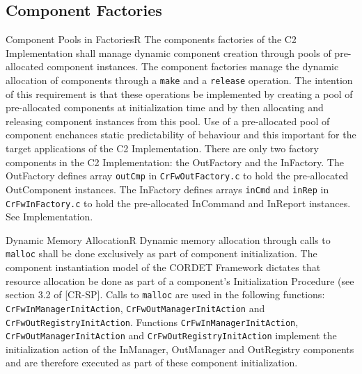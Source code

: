 \documentclass{pnp_article}
\begin{document}
\subsection{Component Factories}

\begin{fwReqNote}{Component Pools in Factories}{R}
{The components factories of the C2 Implementation shall manage dynamic component creation through pools of pre-allocated component instances.}
{The component factories manage the dynamic allocation of components through a \texttt{make} and a \texttt{release} operation. The intention of this requirement is that these operations be implemented by creating a pool of pre-allocated components at initialization time and by then allocating and releasing component instances from this pool.}
{Use of a pre-allocated pool of component enchances static predictability of behaviour and this important for the target applications of the C2 Implementation.}
{There are only two factory components in the C2 Implementation: the OutFactory and the InFactory. The OutFactory defines array \texttt{outCmp} in \texttt{CrFwOutFactory.c} to hold the pre-allocated OutComponent instances. The InFactory defines arrays \texttt{inCmd} and \texttt{inRep} in \texttt{CrFwInFactory.c} to hold the pre-allocated InCommand and InReport instances. } 
{See Implementation.}
\end{fwReqNote}




\begin{fwReq}{Dynamic Memory Allocation}{R}
{Dynamic memory allocation through calls to \texttt{malloc} shall be done exclusively as part of component initialization.}
{The component instantiation model of the CORDET Framework dictates that resource allocation be done as part of a component's Initialization Procedure (see section 3.2 of [CR-SP].}
{Calls to \texttt{malloc} are used in the following functions: \texttt{CrFwInManagerInitAction}, \texttt{CrFwOutManagerInitAction} and \texttt{CrFwOutRegistryInitAction}. } 
{Functions \texttt{CrFwInManagerInitAction}, \texttt{CrFwOutManagerInitAction} and \texttt{CrFwOutRegistryInitAction} implement the initialization action of the InManager, OutManager and OutRegistry components and are therefore executed as part of these component initialization.}
\end{fwReq}
\end{document}
